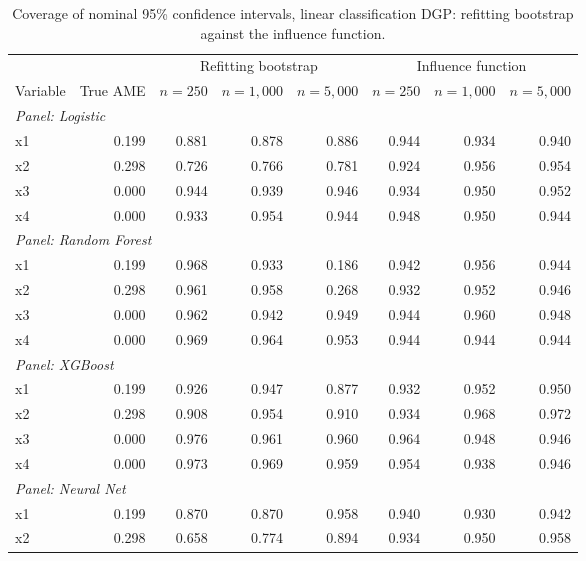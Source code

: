 \begin{table}[htbp]
\centering
\small
\begin{threeparttable}
\caption{Coverage of nominal 95\% confidence intervals, linear classification DGP: refitting bootstrap against the influence function.}
\label{tab:sim3_coverage_classification_linear}
\begin{tabular}{lrrrrrrr}
\toprule
 & & \multicolumn{3}{c}{Refitting bootstrap} & \multicolumn{3}{c}{Influence function} \\
\cmidrule(lr){3-5} \cmidrule(lr){6-8}
Variable & True AME & $n=250$ & $n=1,000$ & $n=5,000$ & $n=250$ & $n=1,000$ & $n=5,000$ \\
\midrule
\multicolumn{8}{l}{\textit{Panel: Logistic}} \\
\quad x1 & 0.199 & 0.881 & 0.878 & 0.886 & 0.944 & 0.934 & 0.940 \\
\quad x2 & 0.298 & 0.726 & 0.766 & 0.781 & 0.924 & 0.956 & 0.954 \\
\quad x3 & 0.000 & 0.944 & 0.939 & 0.946 & 0.934 & 0.950 & 0.952 \\
\quad x4 & 0.000 & 0.933 & 0.954 & 0.944 & 0.948 & 0.950 & 0.944 \\
\midrule
\multicolumn{8}{l}{\textit{Panel: Random Forest}} \\
\quad x1 & 0.199 & 0.968 & 0.933 & 0.186 & 0.942 & 0.956 & 0.944 \\
\quad x2 & 0.298 & 0.961 & 0.958 & 0.268 & 0.932 & 0.952 & 0.946 \\
\quad x3 & 0.000 & 0.962 & 0.942 & 0.949 & 0.944 & 0.960 & 0.948 \\
\quad x4 & 0.000 & 0.969 & 0.964 & 0.953 & 0.944 & 0.944 & 0.944 \\
\midrule
\multicolumn{8}{l}{\textit{Panel: XGBoost}} \\
\quad x1 & 0.199 & 0.926 & 0.947 & 0.877 & 0.932 & 0.952 & 0.950 \\
\quad x2 & 0.298 & 0.908 & 0.954 & 0.910 & 0.934 & 0.968 & 0.972 \\
\quad x3 & 0.000 & 0.976 & 0.961 & 0.960 & 0.964 & 0.948 & 0.946 \\
\quad x4 & 0.000 & 0.973 & 0.969 & 0.959 & 0.954 & 0.938 & 0.946 \\
\midrule
\multicolumn{8}{l}{\textit{Panel: Neural Net}} \\
\quad x1 & 0.199 & 0.870 & 0.870 & 0.958 & 0.940 & 0.930 & 0.942 \\
\quad x2 & 0.298 & 0.658 & 0.774 & 0.894 & 0.934 & 0.950 & 0.958 \\

\end{tabular}
\end{threeparttable}
\end{table}
